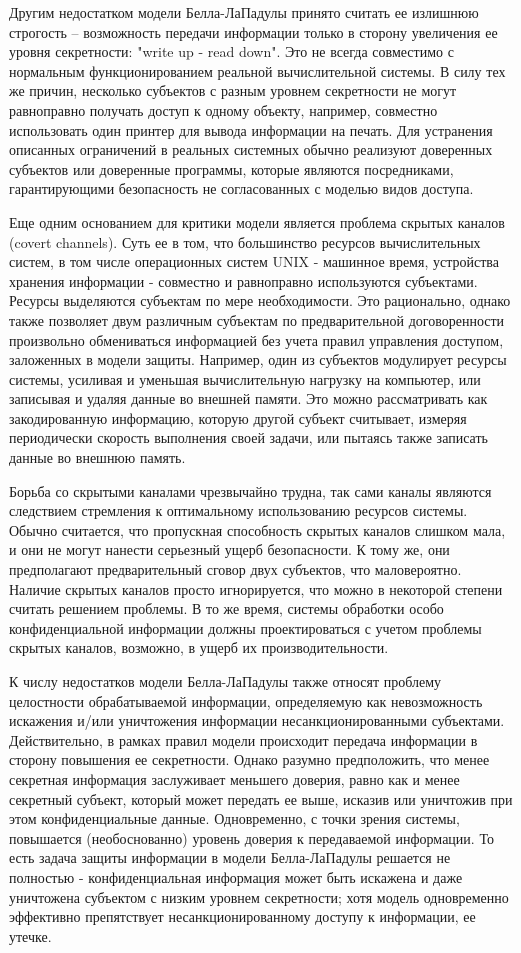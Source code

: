 Другим недостатком модели Белла-ЛаПадулы принято считать ее излишнюю строгость -- возможность передачи информации только в сторону увеличения ее уровня секретности: "write up - read down". Это не всегда совместимо с нормальным функционированием реальной вычислительной системы. В силу тех же причин, несколько субъектов с разным уровнем секретности не могут равноправно получать доступ к одному объекту, например, совместно использовать один принтер для вывода информации на печать. Для устранения описанных ограничений в реальных системных обычно реализуют доверенных субъектов или доверенные программы, которые являются посредниками, гарантирующими безопасность не согласованных с моделью видов доступа. 

Еще одним основанием для критики модели является проблема скрытых каналов (covert channels). Суть ее в том, что большинство ресурсов вычислительных систем, в том числе операционных систем UNIX - машинное время, устройства хранения информации - совместно и равноправно используются субъектами. Ресурсы выделяются субъектам по мере необходимости. Это рационально, однако также позволяет двум различным субъектам по предварительной договоренности произвольно обмениваться информацией без учета правил управления доступом, заложенных в модели защиты. Например, один из субъектов модулирует ресурсы системы, усиливая и уменьшая вычислительную нагрузку на компьютер, или записывая и удаляя данные во внешней памяти. Это можно рассматривать как закодированную информацию, которую другой субъект считывает, измеряя периодически скорость выполнения своей задачи, или пытаясь также записать данные во внешнюю память. 

Борьба со скрытыми каналами чрезвычайно трудна, так сами каналы являются следствием стремления к оптимальному использованию ресурсов системы. Обычно считается, что пропускная способность скрытых каналов слишком мала, и они не могут нанести серьезный ущерб безопасности. К тому же, они предполагают предварительный сговор двух субъектов, что маловероятно. Наличие скрытых каналов просто игнорируется, что можно в некоторой степени считать решением проблемы. В то же время, системы обработки особо конфиденциальной информации должны проектироваться с учетом проблемы скрытых каналов, возможно, в ущерб их производительности. 

К числу недостатков модели Белла-ЛаПадулы также относят проблему целостности обрабатываемой информации, определяемую как невозможность искажения и/или уничтожения информации несанкционированными субъектами. Действительно, в рамках правил модели происходит передача информации в сторону повышения ее секретности. Однако разумно предположить, что менее секретная информация заслуживает меньшего доверия, равно как и менее секретный субъект, который может передать ее выше, исказив или уничтожив при этом конфиденциальные данные. Одновременно, с точки зрения системы, повышается (необоснованно) уровень доверия к передаваемой информации. То есть задача защиты информации в модели Белла-ЛаПадулы решается не полностью - конфиденциальная информация может быть искажена и даже уничтожена субъектом с низким уровнем секретности; хотя модель одновременно эффективно препятствует несанкционированному доступу к информации, ее утечке. 

